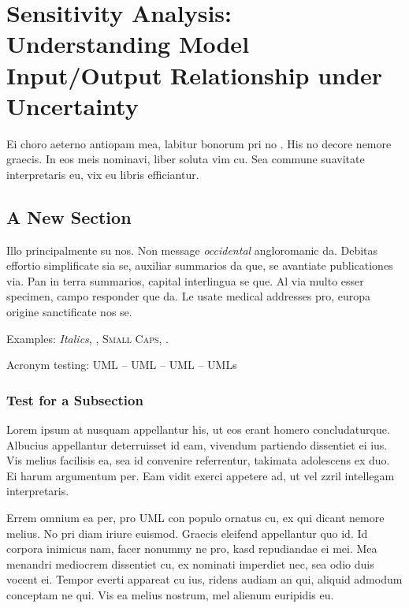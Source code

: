 \chapter[Sensitivity Analysis]{Sensitivity Analysis: Understanding Model Input/Output Relationship under Uncertainty}\label{ch:examples}
Ei choro aeterno antiopam mea, labitur bonorum pri no 
\citeauthor{taleb:2012} \citep{taleb:2012}. His no decore
nemore graecis. In eos meis nominavi, liber soluta vim cu. Sea commune
suavitate interpretaris eu, vix eu libris efficiantur.


\section{A New Section}
Illo principalmente su nos. Non message \emph{occidental} angloromanic
da. Debitas effortio simplificate sia se, auxiliar summarios da que,
se avantiate publicationes via. Pan in terra summarios, capital
interlingua se que. Al via multo esser specimen, campo responder que
da. Le usate medical addresses pro, europa origine sanctificate nos
se.

Examples: \textit{Italics}, , \textsc{Small
	Caps}, .

Acronym testing: \ac{UML} -- \acs{UML} -- \acf{UML} -- \acp{UML}


\subsection{Test for a Subsection}
Lorem ipsum at nusquam appellantur his, ut eos erant homero
concludaturque. Albucius appellantur deterruisset id eam, vivendum
partiendo dissentiet ei ius. Vis melius facilisis ea, sea id convenire
referrentur, takimata adolescens ex duo. Ei harum argumentum per. Eam
vidit exerci appetere ad, ut vel zzril intellegam interpretaris.

Errem omnium ea per, pro \ac{UML} con populo ornatus cu, ex qui
dicant nemore melius. No pri diam iriure euismod. Graecis eleifend
appellantur quo id. Id corpora inimicus nam, facer nonummy ne pro,
kasd repudiandae ei mei. Mea menandri mediocrem dissentiet cu, ex
nominati imperdiet nec, sea odio duis vocent ei. Tempor everti
appareat cu ius, ridens audiam an qui, aliquid admodum conceptam ne
qui. Vis ea melius nostrum, mel alienum euripidis eu.

